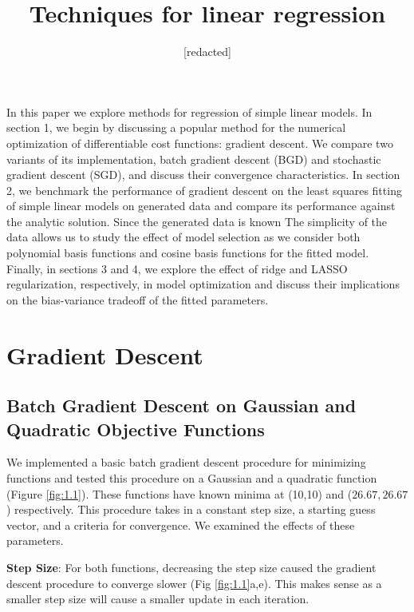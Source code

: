 \documentclass[10pt, twocolumn]{article}
\begin{document}
 
\title{Techniques for linear regression}
\author{[redacted]}
\maketitle
 
In this paper we explore methods for regression of simple linear models. In section 1, we begin by discussing a popular method for the numerical optimization of differentiable cost functions: gradient descent. We compare two variants of its implementation, batch gradient descent (BGD) and stochastic gradient descent (SGD), and discuss their convergence characteristics. In section 2, we benchmark the performance of gradient descent on the least squares fitting of simple linear models on generated data and compare its performance against the analytic solution. Since the generated data is known The simplicity of the data allows us to study the effect of model selection as we consider both polynomial basis functions and cosine basis functions for the fitted model. Finally, in sections 3 and 4, we explore the effect of ridge and LASSO regularization, respectively, in model optimization and discuss their implications on the bias-variance tradeoff of the fitted parameters.

\section{Gradient Descent}

\subsection{Batch Gradient Descent on Gaussian and Quadratic Objective Functions}

We implemented a basic batch gradient descent procedure for minimizing functions and tested this procedure on a Gaussian and  a quadratic function (Figure \ref{fig:1.1}). These functions have known minima at (10,10) and ($26.67,26.67$) respectively. This procedure takes in a constant step size, a starting guess vector, and a criteria for convergence. We examined the effects of these parameters.
 
 \medskip

 \textbf{Step Size}: For both functions, decreasing the step size caused the gradient descent procedure to converge slower (Fig \ref{fig:1.1}a,e). This makes sense as a smaller step size will cause a smaller update in each iteration. 
 
\end{document}
